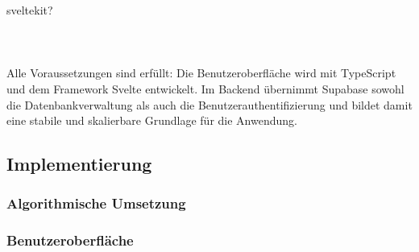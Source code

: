 sveltekit?\\\\\\\\
Alle Voraussetzungen sind erfüllt: Die Benutzeroberfläche wird mit TypeScript und dem Framework Svelte entwickelt. Im Backend übernimmt Supabase sowohl die Datenbankverwaltung als auch die Benutzerauthentifizierung und bildet damit eine stabile und skalierbare Grundlage für die Anwendung.
\subsection{Implementierung}
\subsubsection{Algorithmische Umsetzung}
\subsubsection{Benutzeroberfläche}